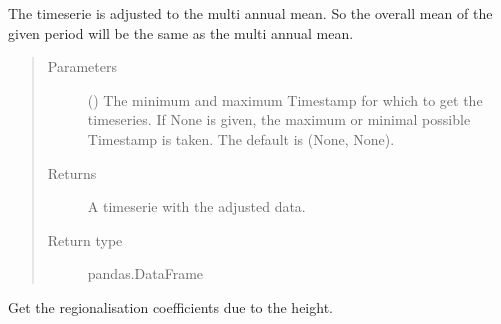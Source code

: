 \documentclass[letterpaper,10pt,english]{sphinxmanual}
\begin{document}
\begin{fulllineitems}
\begin{fulllineitems}
\sphinxAtStartPar
The timeserie is adjusted to the multi annual mean.
So the overall mean of the given period will be the same as the multi annual mean.
\begin{quote}\begin{description}
\item[{Parameters}] \leavevmode
\sphinxAtStartPar
{} (\sphinxstyleliteralemphasis{\sphinxupquote{, }}) \textendash{} The minimum and maximum Timestamp for which to get the timeseries.
If None is given, the maximum or minimal possible Timestamp is taken.
The default is (None, None).

\item[{Returns}] \leavevmode
\sphinxAtStartPar
A timeserie with the adjusted data.

\item[{Return type}] \leavevmode
\sphinxAtStartPar
pandas.DataFrame

\end{description}\end{quote}

\end{fulllineitems}


\begin{fulllineitems}
\label{\detokenize{weatherDB:weatherDB.station.StationBase.get_coef}}
\end{fulllineitems}


\begin{fulllineitems}
\label{\detokenize{weatherDB:weatherDB.station.StationBase.get_coef_height}}
\sphinxAtStartPar
Get the regionalisation coefficients due to the height.


\end{fulllineitems}
\end{fulllineitems}
\end{document}
